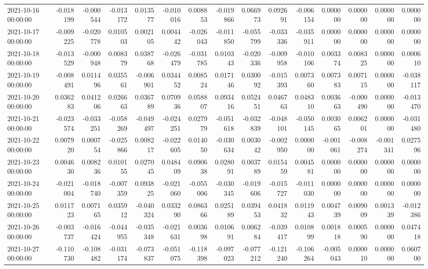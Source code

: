 \begin{tabular}{lrrrrrrrrrrrrrr}
2021-10-16 00:00:00 & -0.018199 & -0.000544 & -0.013172 & 0.013577 & -0.010016 & 0.008853 & -0.019866 & 0.066973 & 0.092691 & -0.006154 & 0.000000 & 0.000000 & 0.000000 & 0.000000 \\
2021-10-17 00:00:00 & -0.009225 & -0.020778 & 0.010503 & 0.002105 & 0.004442 & -0.026043 & -0.011850 & -0.055799 & -0.033336 & -0.035911 & 0.000000 & 0.000000 & 0.000000 & 0.000000 \\
2021-10-18 00:00:00 & -0.013529 & -0.000948 & 0.008379 & 0.038768 & -0.026479 & -0.031785 & 0.010343 & -0.020336 & -0.009958 & -0.010106 & 0.003374 & 0.008325 & 0.000000 & 0.000610 \\
2021-10-19 00:00:00 & -0.008491 & 0.011496 & 0.035561 & -0.006901 & 0.034452 & 0.008524 & 0.017146 & 0.030092 & -0.015393 & 0.007360 & 0.007383 & 0.007115 & 0.000000 & -0.038117 \\
2021-10-20 00:00:00 & 0.036283 & 0.041206 & 0.026663 & 0.036789 & 0.070936 & 0.058807 & 0.093416 & 0.052451 & 0.046763 & 0.048310 & 0.003663 & -0.000490 & 0.000000 & -0.013470 \\
2021-10-21 00:00:00 & -0.023574 & -0.033251 & -0.058269 & -0.049497 & -0.024251 & 0.027979 & -0.051618 & -0.032839 & -0.048101 & -0.050145 & 0.003065 & 0.006201 & 0.000000 & -0.031480 \\
2021-10-22 00:00:00 & 0.007920 & 0.000754 & -0.025866 & 0.008217 & -0.022605 & 0.014050 & -0.030634 & 0.003042 & -0.002950 & 0.000000 & -0.001061 & -0.008274 & -0.001341 & 0.027596 \\
2021-10-23 00:00:00 & 0.004630 & 0.008236 & 0.010155 & 0.027045 & 0.048409 & 0.090638 & 0.028091 & 0.003789 & 0.015459 & 0.004581 & 0.000000 & 0.000000 & 0.000000 & 0.000000 \\
2021-10-24 00:00:00 & -0.021004 & -0.018740 & -0.007359 & 0.093825 & -0.021060 & -0.055006 & -0.030345 & -0.019606 & -0.015727 & -0.011030 & 0.000000 & 0.000000 & 0.000000 & 0.000000 \\
2021-10-25 00:00:00 & 0.011723 & 0.007165 & 0.035912 & -0.040324 & 0.033290 & 0.086366 & 0.025189 & 0.039453 & 0.041832 & 0.011943 & 0.004739 & 0.009009 & 0.001339 & -0.012386 \\
2021-10-26 00:00:00 & -0.003737 & -0.016424 & -0.044955 & -0.035348 & -0.021631 & 0.003698 & 0.010691 & 0.006284 & -0.039417 & 0.010899 & 0.001818 & 0.000590 & 0.000000 & 0.047418 \\
2021-10-27 00:00:00 & -0.110730 & -0.108482 & -0.031174 & -0.073837 & -0.051075 & -0.118398 & -0.097023 & -0.077212 & -0.121240 & -0.106264 & -0.005043 & 0.000010 & 0.000000 & 0.060700 \\

\end{tabular}
